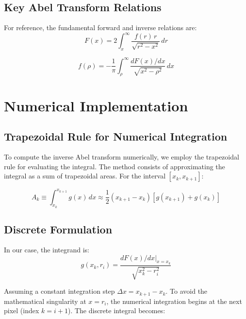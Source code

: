 \documentclass[11pt,a4paper]{article}
\begin{document}
\subsection{Key Abel Transform Relations}

For reference, the fundamental forward and inverse relations are:
\begin{equation}
\boxed{F(x) = 2\int_x^{\infty} \frac{f(r) \, r}{\sqrt{r^2 - x^2}} \, dr}
\end{equation}

\begin{equation}
\boxed{f(\rho) = -\frac{1}{\pi} \int_{\rho}^{\infty} \frac{dF(x)/dx}{\sqrt{x^2 - \rho^2}} \, dx}
\end{equation}

\section{Numerical Implementation}

\subsection{Trapezoidal Rule for Numerical Integration}

To compute the inverse Abel transform numerically, we employ the trapezoidal rule for evaluating the integral. The method consists of approximating the integral as a sum of trapezoidal areas. For the interval $[x_k, x_{k+1}]$:

\begin{equation}
A_k \equiv \int_{x_k}^{x_{k+1}} g(x) \, dx \approx \frac{1}{2}(x_{k+1} - x_k)[g(x_{k+1}) + g(x_k)]
\end{equation}

\subsection{Discrete Formulation}

In our case, the integrand is:
\begin{equation}
g(x_k, r_i) = \frac{d F(x)/dx\big|_{x=x_k}}{\sqrt{x_k^2 - r_i^2}}
\end{equation}

Assuming a constant integration step $\Delta x = x_{k+1} - x_k$. To avoid the mathematical singularity at $x = r_i$, the numerical integration begins at the next pixel (index $k = i+1$). The discrete integral becomes:
\end{document}
